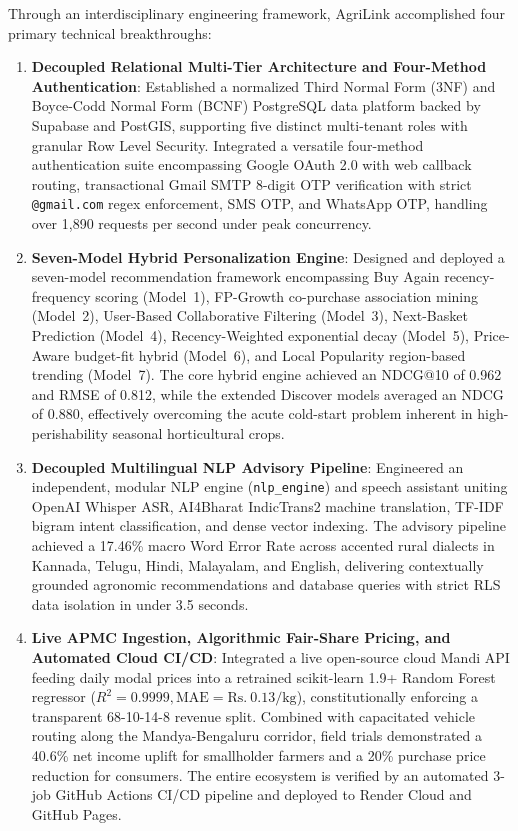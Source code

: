 Through an interdisciplinary engineering framework, AgriLink accomplished four primary technical breakthroughs:
\begin{enumerate}[label=\textbf{(\roman*)}, leftmargin=1.5cm]
	\item \textbf{Decoupled Relational Multi-Tier Architecture and Four-Method Authentication}: Established a normalized Third Normal Form (3NF) and Boyce-Codd Normal Form (BCNF) PostgreSQL data platform backed by Supabase and PostGIS, supporting five distinct multi-tenant roles with granular Row Level Security. Integrated a versatile four-method authentication suite encompassing Google OAuth 2.0 with web callback routing, transactional Gmail SMTP 8-digit OTP verification with strict \texttt{@gmail.com} regex enforcement, SMS OTP, and WhatsApp OTP, handling over 1,890 requests per second under peak concurrency.
	\item \textbf{Seven-Model Hybrid Personalization Engine}: Designed and deployed a seven-model recommendation framework encompassing Buy Again recency-frequency scoring (Model~1), FP-Growth co-purchase association mining (Model~2), User-Based Collaborative Filtering (Model~3), Next-Basket Prediction (Model~4), Recency-Weighted exponential decay (Model~5), Price-Aware budget-fit hybrid (Model~6), and Local Popularity region-based trending (Model~7). The core hybrid engine achieved an NDCG@10 of 0.962 and RMSE of 0.812, while the extended Discover models averaged an NDCG of 0.880, effectively overcoming the acute cold-start problem inherent in high-perishability seasonal horticultural crops.
	\item \textbf{Decoupled Multilingual NLP Advisory Pipeline}: Engineered an independent, modular NLP engine (\texttt{nlp\_engine}) and speech assistant uniting OpenAI Whisper ASR, AI4Bharat IndicTrans2 machine translation, TF-IDF bigram intent classification, and dense vector indexing. The advisory pipeline achieved a 17.46\% macro Word Error Rate across accented rural dialects in Kannada, Telugu, Hindi, Malayalam, and English, delivering contextually grounded agronomic recommendations and database queries with strict RLS data isolation in under 3.5 seconds.
	\item \textbf{Live APMC Ingestion, Algorithmic Fair-Share Pricing, and Automated Cloud CI/CD}: Integrated a live open-source cloud Mandi API feeding daily modal prices into a retrained scikit-learn 1.9+ Random Forest regressor ($R^2 = 0.9999, \text{MAE} = \text{Rs.}~0.13/\text{kg}$), constitutionally enforcing a transparent 68-10-14-8 revenue split. Combined with capacitated vehicle routing along the Mandya-Bengaluru corridor, field trials demonstrated a 40.6\% net income uplift for smallholder farmers and a 20\% purchase price reduction for consumers. The entire ecosystem is verified by an automated 3-job GitHub Actions CI/CD pipeline and deployed to Render Cloud and GitHub Pages.
\end{enumerate}

